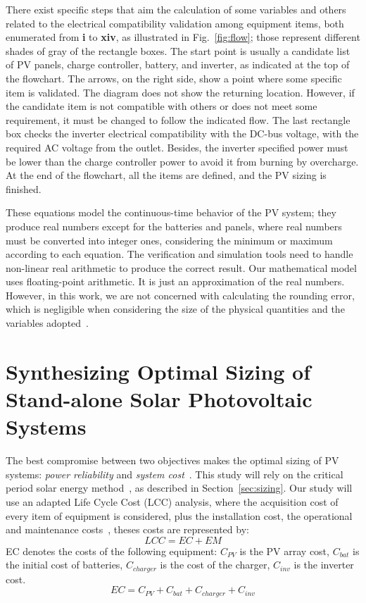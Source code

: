 \documentclass[10pt,journal,compsoc]{IEEEtran}
\begin{document}
There exist specific steps that aim the calculation of some variables and others related to the electrical compatibility validation among equipment items, both enumerated from \textbf{i} to \textbf{xiv}, as illustrated in Fig.~\ref{fig:flow}; those represent different shades of gray of the rectangle boxes. The start point is usually a candidate list of PV panels, charge controller, battery, and inverter, as indicated at the top of the flowchart. The arrows, on the right side, show a point where some specific item is validated. The diagram does not show the returning location. However, if the candidate item is not compatible with others or does not meet some requirement, it must be changed to follow the indicated flow. The last rectangle box checks the inverter electrical compatibility with the DC-bus voltage, with the required AC voltage from the outlet. Besides, the inverter specified power must be lower than the charge controller power to avoid it from burning by overcharge. At the end of the flowchart, all the items are defined, and the PV sizing is finished.

These equations model the continuous-time behavior of the PV system; they produce real numbers except for the batteries and panels, where real numbers must be converted into integer ones, considering the minimum or maximum according to each equation. The verification and simulation tools need to handle non-linear real arithmetic to produce the correct result. Our mathematical model uses floating-point arithmetic. It is just an approximation of the real numbers. However, in this work, we are not concerned with calculating the rounding error, which is negligible when considering the size of the physical quantities and the variables adopted~\cite{DBLP:journals/corr/abs-2004-12699}.

\section{Synthesizing Optimal Sizing of Stand-alone Solar Photovoltaic Systems}
\label{sec:SynthesizingOptimalSolarPhotovoltaicSystems}

The best compromise between two objectives makes the optimal sizing of PV systems: \textit{power reliability} and \textit{system cost}~\cite{Alsadi2018}. This study will rely on the critical period solar energy method~\cite{Pinho}, as described in Section~\ref{sec:sizing}.   Our study will use an adapted Life Cycle Cost (LCC) analysis, where the acquisition cost of every item of equipment is considered, plus the installation cost, the operational and maintenance costs~\cite{Alsadi2018}, theses costs are represented by:
\begin{equation}
\label{eq:LCC}
LCC = EC + EM
\end{equation}
%
\noindent EC denotes the costs of the following equipment: $C_{PV}$ is the PV array cost, $C_{bat}$ is the initial cost of batteries, $C_{charger}$ is the cost of the charger, $C_{inv}$ is the inverter cost.
\begin{equation}
\label{eq:EquipamentCost}
EC = C_{PV} + C_{bat} + C_{charger} + C_{inv}
\end{equation}
\end{document}
